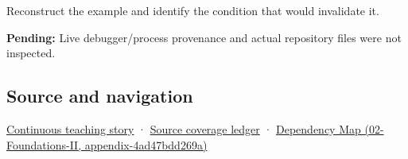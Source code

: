 Reconstruct the example and identify the condition that would invalidate it.

\textbf{Pending:} Live debugger/process provenance and actual repository files were not inspected.

\subsection{Source and navigation}\label{source-and-navigation}

\href{Continuous\%20Notes/Computing\%20Foundations\%20-\%20From\%20Bits\%20to\%20C++\%20and\%20Systems\%20APIs\#Bytes\%20become\%20a\%20durable\%20agreement}{Continuous teaching story} · \hyperref[appendix-fd090d982a15]{Source coverage ledger} · \href{}{Dependency Map (02-Foundations-II, appendix-4ad47bdd269a)}
